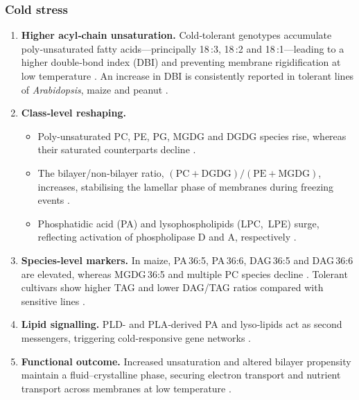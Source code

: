 \documentclass[10pt,letterpaper]{article}
\begin{document}
\subsubsection*{Cold stress}
\label{sec:cold}

\begin{enumerate}[label=\textbf{\arabic*.}, leftmargin=1.2em]
  \item \textbf{Higher acyl‑chain unsaturation.}  Cold‐tolerant genotypes accumulate poly‑unsaturated fatty acids—principally 18\,:3, 18\,:2 and 18\,:1—leading to a higher double‑bond index (DBI) and preventing membrane rigidification at low temperature \citep[pp.~431–440, 460]{Low_temp_stress_Bhattacharya}.  An increase in DBI is consistently reported in tolerant lines of \textit{Arabidopsis}, maize and peanut \citep[pp.~11–12]{Lipid_transcriptome_Cold_stress_Yu}.

  \item \textbf{Class‑level reshaping.}  
        \begin{itemize}
          \item Poly‑unsaturated PC, PE, PG, MGDG and DGDG species rise, whereas their saturated counterparts decline \citep[pp.~3–4]{Low_temperatures_Wang,Low_temp_stress_Bhattacharya}.  
          \item The bilayer/non‑bilayer ratio, \(\mathrm{(PC+DGDG)/(PE+MGDG)}\), increases, stabilising the lamellar phase of membranes during freezing events \citep[pp.~492–493]{Low_temp_stress_Bhattacharya}.  
          \item Phosphatidic acid (PA) and lysophospholipids (LPC, LPE) surge, reflecting activation of phospholipase D and A, respectively \citep[pp.~456, 472--474]{Low_temp_stress_Bhattacharya}.
        \end{itemize}

  \item \textbf{Species‑level markers.}  In maize, PA\,36:5, PA\,36:6, DAG\,36:5 and DAG\,36:6 are elevated, whereas MGDG\,36:5 and multiple PC species decline \citep[pp.~6–8]{cold_tolerance_maize_Shi}.  Tolerant cultivars show higher TAG and lower DAG/TAG ratios compared with sensitive lines \citep[pp.~11]{Lipid_transcriptome_Cold_stress_Yu}.

  \item \textbf{Lipid signalling.}  PLD- and PLA‑derived PA and lyso‑lipids act as second messengers, triggering cold‐responsive gene networks \citep[pp.~454–456]{Low_temp_stress_Bhattacharya}.

  \item \textbf{Functional outcome.}  Increased unsaturation and altered bilayer propensity maintain a fluid–crystalline phase, securing electron transport and nutrient transport across membranes at low temperature \citep[pp.~463–465]{Low_temp_stress_Bhattacharya}.
\end{enumerate}
\end{document}
